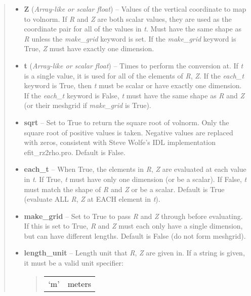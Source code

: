 \documentclass[letterpaper,10pt,english]{sphinxmanual}
\begin{document}
\begin{fulllineitems}
\begin{fulllineitems}
\begin{quote}
\begin{description}
\begin{itemize}
\item {} 
\textbf{Z} (\emph{Array-like or scalar float}) -- Values of the vertical coordinate to
map to volnorm. If \emph{R} and \emph{Z} are both scalar values,
they are used as the coordinate pair for all of the values in
\emph{t}. Must have the same shape as \emph{R} unless the \emph{make\_grid}
keyword is set. If the \emph{make\_grid} keyword is True, \emph{Z} must
have exactly one dimension.

\item {} 
\textbf{t} (\emph{Array-like or scalar float}) -- Times to perform the conversion at.
If \emph{t} is a single value, it is used for all of the elements of
\emph{R}, \emph{Z}. If the \emph{each\_t} keyword is True, then \emph{t} must be
scalar or have exactly one dimension. If the \emph{each\_t} keyword is
False, \emph{t} must have the same shape as \emph{R} and \emph{Z} (or their
meshgrid if \emph{make\_grid} is True).

\item {} 
\textbf{sqrt} -- Set to True to return the square root of volnorm.
Only the square root of positive values is taken. Negative
values are replaced with zeros, consistent with Steve Wolfe's
IDL implementation efit\_rz2rho.pro. Default is False.

\item {} 
\textbf{each\_t} -- When True, the elements in \emph{R}, \emph{Z} are evaluated
at each value in \emph{t}. If True, \emph{t} must have only one dimension
(or be a scalar). If False, \emph{t} must match the shape of \emph{R} and
\emph{Z} or be a scalar. Default is True (evaluate ALL \emph{R}, \emph{Z} at
EACH element in \emph{t}).

\item {} 
\textbf{make\_grid} -- Set to True to pass \emph{R} and \emph{Z} through
 before evaluating. If this is set to
True, \emph{R} and \emph{Z} must each only have a single dimension, but
can have different lengths. Default is False (do not form
meshgrid).

\item {} 
\textbf{length\_unit} -- 
Length unit that \emph{R}, \emph{Z} are given in.
If a string is given, it must be a valid unit specifier:
\begin{quote}

\begin{tabulary}{\linewidth}{|L|L|}
\hline

`m'
 & 
meters
\\


\end{tabulary}
\end{quote}
\end{itemize}
\end{description}
\end{quote}
\end{fulllineitems}
\end{fulllineitems}
\end{document}
